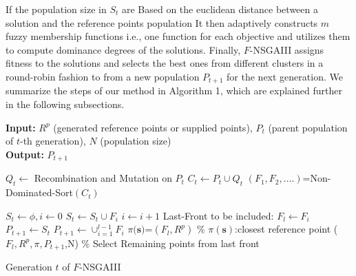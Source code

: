 \documentclass[letterpaper, 10 pt, conference]{ieeeconf}  %
\begin{document}
If the population size in $S_t$ are Based on the euclidean distance between a solution and the reference points population
It then adaptively constructs $m$ fuzzy membership functions i.e., one function for each objective 
and utilizes them to compute dominance degrees of the solutions. Finally, $F$-NSGAIII assigns fitness to the solutions and selects the best ones from different clusters in a round-robin fashion to from a new population $P_{t+1}$ for the next generation.  
We summarize the steps of our method in Algorithm 1, which are explained further in the following subsections.



 \begin{algorithm}[!h]
	
 	\textbf{Input:} $R^p$ (generated reference points or supplied points), $P_t$ (parent population of $t$-th generation), $N$ (population size)\\
 	\textbf{Output:} $P_{t+1}$
	
 	\begin{algorithmic}[1]
		\State $Q_t \gets $ Recombination and Mutation on $P_t$
 		\State $C_t \gets P_t \cup Q_t$				 	
 		\State $(F_1,F_2,....)$=Non-Dominated-Sort$(C_t)$
        
        \State $S_t \gets \phi , i\gets 0$
        \State $S_t \gets S_t \cup F_i$
        \State $i \gets i+1$
        \EndWhile
        \State Last-Front to be included: $F_l \gets F_i$
        \State $P_{t+1} \gets S_t$
        \Else
        \State $P_{t+1} \gets \cup _{i=1}^{l-1}F_i$
        \State $\pi({\mathbf{s})}$=$(F_l,R^p)$ \% $\pi({\mathbf{s}})$:closest reference point 
        \State {}($F_l,R^p,\pi,P_{t+1}$,N)  \% Select Remaining points from last front
        
        \EndIf
        
        
		
	\end{algorithmic} 
	
	\caption{Generation $t$ of $F$-NSGAIII}
	
 	\label{alg:completeAlgorithm}
 \end{algorithm}
\end{document}
